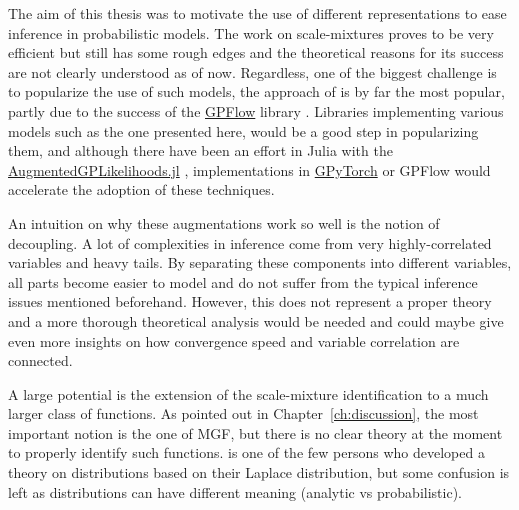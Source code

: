 

\graphicspath{{9_conclusion/figures/}}

The aim of this thesis was to motivate the use of different representations to ease inference in probabilistic models.
The work on scale-mixtures proves to be very efficient but still has some rough edges and the theoretical reasons for its success are not clearly understood as of now.
Regardless, one of the biggest challenge is to popularize the use of such models, the approach of \citet{Hensman2015} is by far the most popular, partly due to the success of the \href{https://github.com/GPflow/GPflow}{GPFlow} library \cite{GPflow2017}.
Libraries implementing various models such as the one presented here, would be a good step in popularizing them, and although there have been an effort in Julia with the \href{https://github.com/JuliaGaussianProcesses/AugmentedGPLikelihoods.jl}{AugmentedGPLikelihoods.jl} \cite{theo_galy_fajou_2022_6347022}, implementations in \href{https://gpytorch.ai/}{GPyTorch} \cite{gardner2018gpytorch} or GPFlow would accelerate the adoption of these techniques.

An intuition on why these augmentations work so well is the notion of decoupling.
A lot of complexities in inference come from very highly-correlated variables and heavy tails.
By separating these components into different variables, all parts become easier to model and do not suffer from the typical inference issues mentioned beforehand.
However, this does not represent a proper theory and a more thorough theoretical analysis would be needed and could maybe give even more insights on how convergence speed and variable correlation are connected.

A large potential is the extension of the scale-mixture identification to a much larger class of functions.
As pointed out in Chapter~\ref{ch:discussion}, the most important notion is the one of \acl{MGF}, but there is no clear theory at the moment to properly identify such functions.
\citet{schwartz1952transformation} is one of the few persons who developed a theory on distributions based on their Laplace distribution, but some confusion is left as distributions can have different meaning (analytic vs probabilistic).

